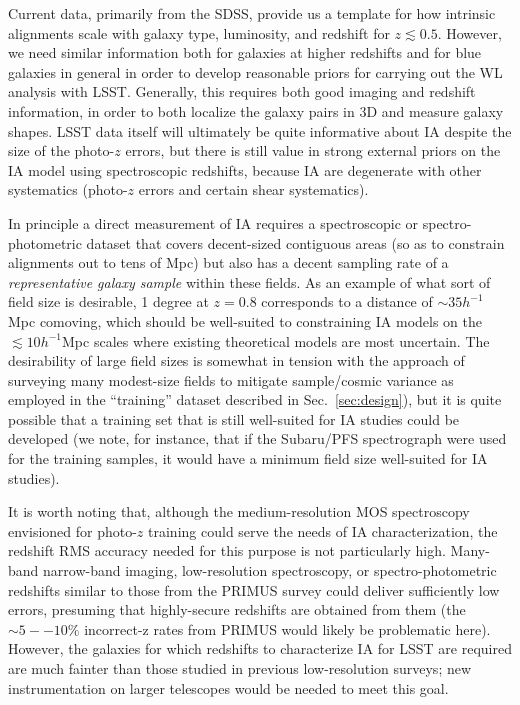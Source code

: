 Current data, primarily from the SDSS, provide us a template for how intrinsic alignments scale with
galaxy type, luminosity, and redshift for $z\lesssim 0.5$.  However, we need similar information both for
galaxies at higher redshifts and for blue galaxies in general in order to develop reasonable priors for carrying out the WL analysis with LSST. Generally, this
requires both good imaging and redshift information, in order to both localize the galaxy pairs in
3D and measure galaxy shapes.   LSST data itself will ultimately be quite informative about
IA despite the size of the photo-$z$ errors, but there is still value in strong external priors on
the IA model using spectroscopic redshifts, because IA are degenerate with other systematics (photo-$z$ errors and certain shear systematics).

In principle a direct measurement of IA requires a spectroscopic or spectro-photometric dataset that covers decent-sized
contiguous areas (so as to constrain alignments out to tens of Mpc) but also has a decent sampling rate
of a {\em representative galaxy sample} within these fields.  As an example of what sort of field size is desirable, 1 degree at $z=0.8$ corresponds to a distance of $\sim 35 h^{-1}$ Mpc comoving, which should be well-suited to
constraining IA models on the $\lesssim 10 h^{-1}$Mpc scales where existing theoretical models are
most uncertain.  The desirability of large field sizes is somewhat in tension with the approach of surveying many modest-size fields to mitigate sample/cosmic variance as employed in the ``training'' dataset described in
Sec.~\ref{sec:design}), but it is quite possible that a training set that is still well-suited for IA studies could be developed (we note, for instance, that if the Subaru/PFS spectrograph were used for the training samples, it would have a minimum field size well-suited for IA studies).  

It is worth noting that, although the medium-resolution MOS spectroscopy envisioned for photo-$z$ training could serve the needs of IA characterization, the redshift RMS accuracy needed for this purpose is not particularly high.  Many-band narrow-band imaging, low-resolution spectroscopy, or spectro-photometric redshifts similar to those from the PRIMUS survey could deliver sufficiently low errors, presuming that highly-secure redshifts are obtained from them (the $\sim 5--10\%$ incorrect-z rates from PRIMUS would likely be problematic here). However, the galaxies for which redshifts to characterize IA for LSST are required are much fainter than those studied in previous low-resolution surveys; new instrumentation on larger telescopes would be needed to meet this goal.

